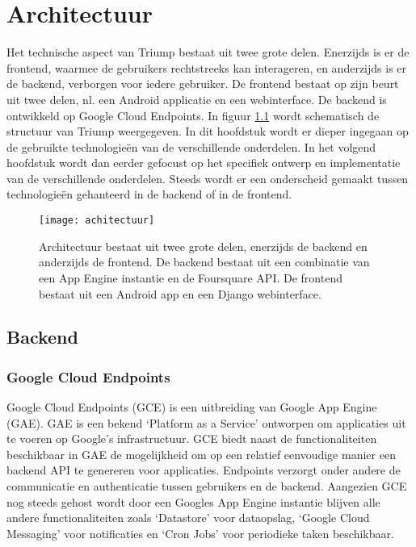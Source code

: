 
\chapter{Architectuur}

Het technische aspect van Triump bestaat uit twee grote delen. Enerzijds is er de frontend, waarmee de gebruikers rechtstreeks kan interageren, en anderzijds is er de backend, verborgen voor iedere gebruiker. De frontend bestaat op zijn beurt uit twee delen, nl. een Android applicatie en een webinterface. De backend is ontwikkeld op Google Cloud Endpoints. In figuur \ref{fig:algemene structuur} wordt schematisch de structuur van Triump weergegeven. In dit hoofdstuk wordt er dieper ingegaan op de gebruikte technologieën van de verschillende onderdelen. In het volgend hoofdstuk wordt dan eerder gefocust op het specifiek ontwerp en implementatie van de verschillende onderdelen. Steeds wordt er een onderscheid gemaakt tussen technologieën gehanteerd in de backend of in de frontend.

\begin{figure}[H]
	\centering
	\texttt{[image: achitectuur]}
	\caption{Architectuur bestaat uit twee grote delen, enerzijds de backend en anderzijds de frontend. De backend bestaat uit een combinatie van een App Engine instantie en de Foursquare API. De frontend bestaat uit een Android app en een Django webinterface.}
	\label{fig:algemene structuur}
	
\end{figure}

\section{Backend}

\subsection{Google Cloud Endpoints}
\label{sec: GCE}

Google Cloud Endpoints (GCE) is een uitbreiding van Google App Engine (GAE). GAE is een bekend `Platform as a Service' ontworpen om applicaties uit te voeren op Google's infrastructuur. GCE biedt naast de functionaliteiten beschikbaar in GAE de mogelijkheid om op een relatief eenvoudige manier een backend API te genereren voor applicaties.  Endpoints verzorgt onder andere de communicatie en authenticatie tussen gebruikers en de backend.
Aangezien GCE nog steeds gehost wordt door een Googles App Engine instantie blijven alle andere functionaliteiten zoals `Datastore' voor dataopslag, `Google Cloud Messaging' voor notificaties en `Cron Jobs' voor periodieke taken beschikbaar.

